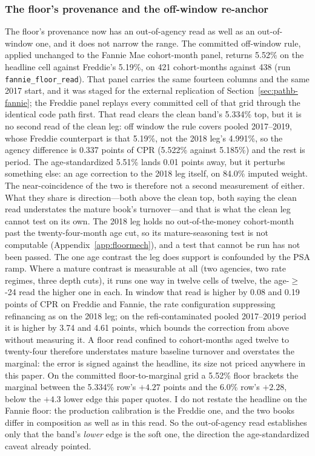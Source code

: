 \documentclass[12pt]{article}
\begin{document}
\subsubsection{The floor's provenance and the off-window re-anchor}

The floor's provenance now has an out-of-agency read as well as an out-of-window one, and it does not narrow the range. The committed off-window rule, applied unchanged to the Fannie Mae cohort-month panel, returns 5.52\% on the headline cell against Freddie's 5.19\%, on 421 cohort-months against 438 (run \texttt{fannie\_floor\_read}). That panel carries the same fourteen columns and the same 2017 start, and it was staged for the external replication of Section~\ref{sec:pathb-fannie}; the Freddie panel replays every committed cell of that grid through the identical code path first. That read clears the clean band's 5.334\% top, but it is no second read of the clean leg: off window the rule covers pooled 2017--2019, whose Freddie counterpart is that 5.19\%, not the 2018 leg's 4.991\%, so the agency difference is 0.337 points of CPR (5.522\% against 5.185\%) and the rest is period. The age-standardized 5.51\% lands 0.01 points away, but it perturbs something else: an age correction to the 2018 leg itself, on 84.0\% imputed weight. The near-coincidence of the two is therefore not a second measurement of either. What they share is direction---both above the clean top, both saying the clean read understates the mature book's turnover---and that is what the clean leg cannot test on its own. The 2018 leg holds no out-of-the-money cohort-month past the twenty-four-month age cut, so its mature-seasoning test is not computable (Appendix~\ref{app:floormech}), and a test that cannot be run has not been passed. The one age contrast the leg does support is confounded by the PSA ramp. Where a mature contrast is measurable at all (two agencies, two rate regimes, three depth cuts), it runs one way in twelve cells of twelve, the age-$\geq$-24 read the higher one in each. In window that read is higher by 0.08 and 0.19 points of CPR on Freddie and Fannie, the rate configuration suppressing refinancing as on the 2018 leg; on the refi-contaminated pooled 2017--2019 period it is higher by 3.74 and 4.61 points, which bounds the correction from above without measuring it. A floor read confined to cohort-months aged twelve to twenty-four therefore understates mature baseline turnover and overstates the marginal: the error is signed against the headline, its size not priced anywhere in this paper. On the committed floor-to-marginal grid a 5.52\% floor brackets the marginal between the 5.334\% row's $+4.27$ points and the 6.0\% row's $+2.28$, below the $+4.3$ lower edge this paper quotes. I do not restate the headline on the Fannie floor: the production calibration is the Freddie one, and the two books differ in composition as well as in this read. So the out-of-agency read establishes only that the band's \emph{lower} edge is the soft one, the direction the age-standardized caveat already pointed.
\end{document}
